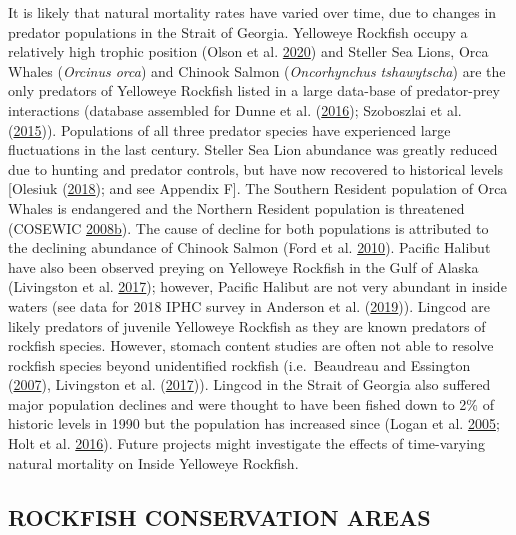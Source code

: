 \documentclass[11pt]{book}
\begin{document}
It is likely that natural mortality rates have varied over time, due to changes in predator populations in the Strait of Georgia. Yelloweye Rockfish occupy a relatively high trophic position (Olson et al. \protect\hyperlink{ref-olson2020}{2020}) and Steller Sea Lions, Orca Whales (\emph{Orcinus orca}) and Chinook Salmon (\emph{Oncorhynchus tshawytscha}) are the only predators of Yelloweye Rockfish listed in a large data-base of predator-prey interactions (database assembled for Dunne et al. (\protect\hyperlink{ref-dunne2016}{2016}); Szoboszlai et al. (\protect\hyperlink{ref-szoboszlai2015}{2015})). Populations of all three predator species have experienced large fluctuations in the last century. Steller Sea Lion abundance was greatly reduced due to hunting and predator controls, but have now recovered to historical levels {[}Olesiuk (\protect\hyperlink{ref-olesiuk2018}{2018}); and see Appendix F{]}. The Southern Resident population of Orca Whales is endangered and the Northern Resident population is threatened (COSEWIC \protect\hyperlink{ref-cosewic2008b}{2008}\protect\hyperlink{ref-cosewic2008b}{b}). The cause of decline for both populations is attributed to the declining abundance of Chinook Salmon (Ford et al. \protect\hyperlink{ref-ford2010}{2010}). Pacific Halibut have also been observed preying on Yelloweye Rockfish in the Gulf of Alaska (Livingston et al. \protect\hyperlink{ref-livingston2017}{2017}); however, Pacific Halibut are not very abundant in inside waters (see data for 2018 IPHC survey in Anderson et al. (\protect\hyperlink{ref-anderson2019synopsis}{2019})). Lingcod are likely predators of juvenile Yelloweye Rockfish as they are known predators of rockfish species. However, stomach content studies are often not able to resolve rockfish species beyond unidentified rockfish (i.e.~Beaudreau and Essington (\protect\hyperlink{ref-beaudreau2007}{2007}), Livingston et al. (\protect\hyperlink{ref-livingston2017}{2017})). Lingcod in the Strait of Georgia also suffered major population declines and were thought to have been fished down to 2\% of historic levels in 1990 but the population has increased since (Logan et al. \protect\hyperlink{ref-logan2005}{2005}; Holt et al. \protect\hyperlink{ref-holt2016}{2016}). Future projects might investigate the effects of time-varying natural mortality on Inside Yelloweye Rockfish.

\hypertarget{sec:discussion-rca}{%
\subsection{ROCKFISH CONSERVATION AREAS}\label{sec:discussion-rca}}
\end{document}
